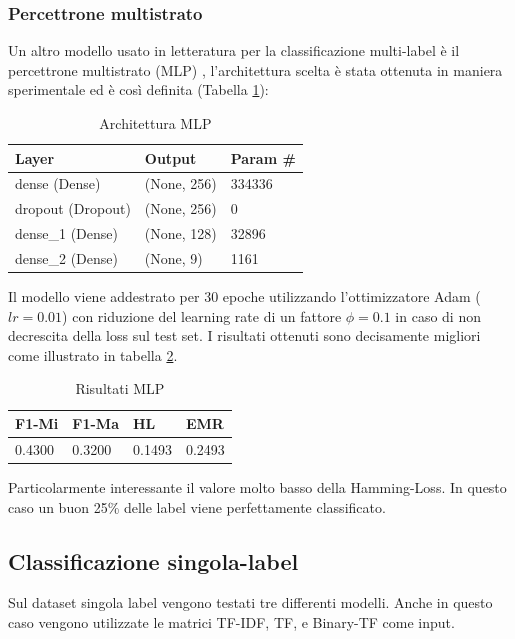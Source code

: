 \documentclass[technote]{IEEEtran}
\begin{document}
\subsubsection{Percettrone multistrato}
Un altro modello usato in letteratura per la classificazione multi-label
è il percettrone multistrato (MLP) \cite{Rosenblatt1963PRINCIPLESON},
l'architettura scelta è stata ottenuta in maniera sperimentale
ed è così definita (Tabella \ref{t_mlp_arch}):
\begin{table}[H]
\centering
\caption{Architettura MLP}
\begin{tabular}{|l|l|l|}
\hline
\textbf{Layer} & \textbf{Output} & \textbf{Param \#} \\ \hline
dense (Dense)         & (None, 256)           & 334336            \\ \hline
dropout (Dropout)     & (None, 256)           & 0                 \\ \hline
dense\_1 (Dense)      & (None, 128)           & 32896             \\ \hline
dense\_2 (Dense)      & (None, 9)             & 1161              \\ \hline
\end{tabular}
\label{t_mlp_arch}
\end{table}
Il modello viene addestrato per 30 epoche utilizzando
l'ottimizzatore Adam ($ lr = 0.01 $) con riduzione del learning rate di un
fattore $ \phi = 0.1 $ in caso di non decrescita della loss sul test set.
I risultati ottenuti sono decisamente migliori come illustrato in tabella \ref{t_res_mlp}.
\begin{table}[H]
\centering
\caption{Risultati MLP}
\begin{tabular}{|l|l|l|l|}
\hline
\textbf{F1-Mi} & \textbf{F1-Ma} & \textbf{HL} & \textbf{EMR} \\ \hline
0.4300         & 0.3200         & 0.1493      & 0.2493       \\ \hline
\end{tabular}
\label{t_res_mlp}
\end{table}
Particolarmente interessante il valore molto basso della Hamming-Loss.
In questo caso un buon 25\% delle label viene perfettamente classificato.

\subsection{Classificazione singola-label}
Sul dataset singola label vengono testati tre differenti modelli.
Anche in questo caso vengono utilizzate le matrici TF-IDF, TF, e Binary-TF come input.
\end{document}
